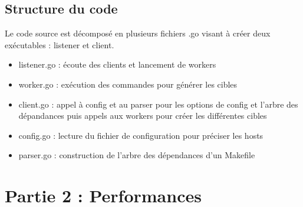 \documentclass[a4paper,11pt]{article}
\begin{document}
\subsection{Structure du code}
Le code source est décomposé en plusieurs fichiers .go visant à créer deux exécutables : listener et client.
\begin{itemize}
\item listener.go : écoute des clients et lancement de workers
\item worker.go : exécution des commandes pour générer les cibles
\item client.go : appel à config et au parser pour les options de config et l'arbre des dépandances puis appels aux workers pour créer les différentes cibles
\item config.go : lecture du fichier de configuration pour préciser les hosts
\item parser.go : construction de l'arbre des dépendances d'un Makefile
\end{itemize}

\section{Partie 2 : Performances}
\end{document}
